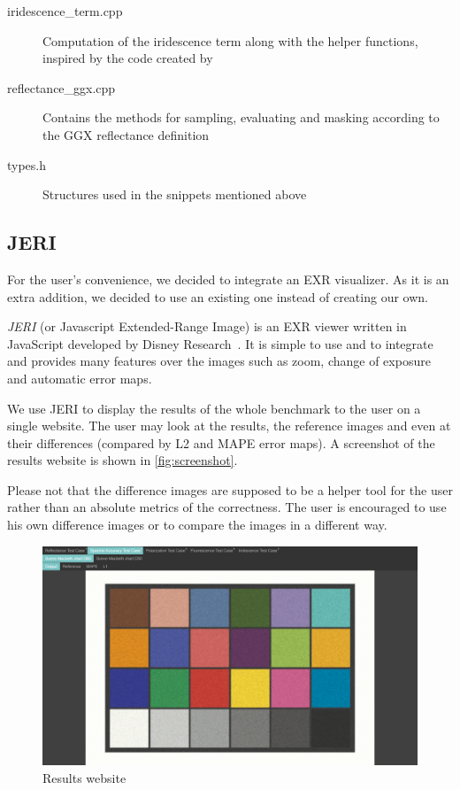 \begin{description}
	\item[iridescence\_term.cpp] Computation of the iridescence term along with the helper functions, inspired by the code created by \citet{belcour2017practical}
	\item[reflectance\_ggx.cpp] Contains the methods for sampling, evaluating and masking according to the GGX reflectance definition~\cite{walter2007microfacet}
	\item[types.h] Structures used in the snippets mentioned above 
\end{description}

\subsection{JERI}

For the user's convenience, we decided to integrate an EXR visualizer. As it is an extra addition, we decided to use an existing one instead of creating our own.

\emph{JERI} (or Javascript Extended-Range Image) is an EXR viewer written in JavaScript developed by Disney Research~\cite{jeriWeb}. It is simple to use and to integrate and provides many features over the images such as zoom, change of exposure and automatic error maps.

We use JERI to display the results of the whole benchmark to the user on a single website. The user may look at the results, the reference images and even at their differences (compared by L2 and MAPE error maps). A screenshot of the results website is shown in \autoref{fig:screenshot}.

Please not that the difference images are supposed to be a helper tool for the user rather than an absolute metrics of the correctness. The user is encouraged to use his own difference images or to compare the images in a different way.

\begin{figure}
	\centering
	\includegraphics[width=\linewidth]{img/screenshot.png}
	\caption{Results website}
	\label{fig:screenshot}
\end{figure}

